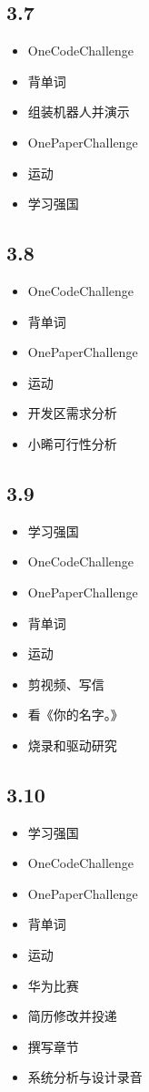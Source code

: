 \documentclass[UTF8]{ctexart}
\begin{document}
\subsection*{3.7}
\begin{itemize}
    \item OneCodeChallenge
    \item 背单词
    \item 组装机器人并演示
    \item OnePaperChallenge
    \item 运动
    \item 学习强国
\end{itemize}

\subsection*{3.8}
\begin{itemize}
    \item OneCodeChallenge
    \item 背单词
    \item OnePaperChallenge
    \item 运动
    \item 开发区需求分析
    \item 小晞可行性分析
\end{itemize}

\subsection*{3.9}
\begin{itemize}
    \item 学习强国
    \item OneCodeChallenge
    \item OnePaperChallenge
    \item 背单词
    \item 运动
    \item 剪视频、写信
    \item 看《你的名字。》
    \item 烧录和驱动研究
\end{itemize}

\subsection*{3.10}
\begin{itemize}
    \item 学习强国
    \item OneCodeChallenge
    \item OnePaperChallenge
    \item 背单词
    \item 运动
    \item 华为比赛
    \item 简历修改并投递
    \item 撰写章节
    \item 系统分析与设计录音
\end{itemize}
\end{document}
